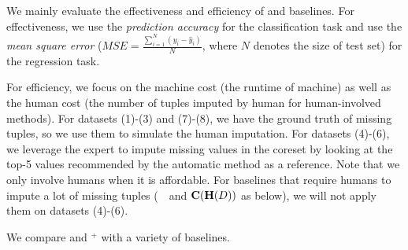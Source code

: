 We mainly evaluate the effectiveness and efficiency of \ours and  baselines. For effectiveness, we use the {\it prediction accuracy} for the classification task and use the {\it mean square error} ($MSE = \frac{\sum_{i=1}^N(y_i-\hat{y}_i)}{N}$, where $N$ denotes the size of test set) for the regression task. 

For efficiency, we focus on the machine cost (\ie the runtime of machine) as well as the human cost (the number of tuples imputed by human for human-involved methods). For datasets (1)-(3) and (7)-(8), we have the ground truth of missing tuples, so we use them to simulate the human imputation. For datasets (4)-(6), we leverage the expert to impute missing values in the coreset by looking at the top-5 values recommended by the automatic method as a reference. Note that we only involve humans when it is affordable. For baselines that require humans to impute a lot of missing tuples (\ie~\truth~and $\mathbf{C}(\mathbf{H}(D))$ as below), we will not apply them on datasets (4)-(6).

 We compare \ours and \ours$^+$ with a variety of baselines.








